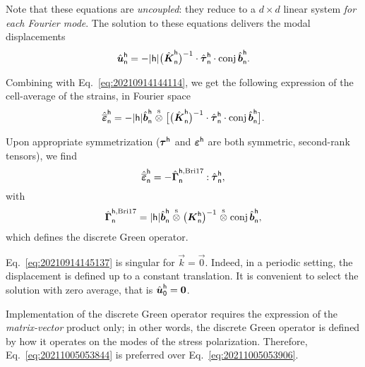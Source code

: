 Note that these equations are \emph{uncoupled}: they reduce to a \(d\times d\)
linear system \emph{for each Fourier mode}. The solution to these equations
delivers the modal displacements
\begin{equation}
  \hat{\boldsymbol u}_\mathsf{n}^\mathsf{h}=-\lvert\mathsf{h}\rvert\bigl(
  \hat{\boldsymbol K}_\mathsf{n}^\mathsf{h}\bigr)^{-1}\cdot
  \hat{\boldsymbol\tau}_\mathsf{n}^\mathsf{h}\cdot\operatorname{conj}\hat{\boldsymbol b}_\mathsf{n}^\mathsf{h}.
\end{equation}

Combining with Eq.~\eqref{eq:20210914144114}, we get the following expression of
the cell-average of the strains, in Fourier space
\begin{equation}
  \label{eq:20211005053844}
  \hat{\overline{\boldsymbol\varepsilon}}_\mathsf{n}^\mathsf{h}=-\lvert\mathsf{h}\rvert
  \hat{\boldsymbol b}_\mathsf{n}^\mathsf{h}\stackrel{\mathrm{s}}{\otimes}\bigl[\bigl(
  \hat{\boldsymbol K}_\mathsf{n}^\mathsf{h}\bigr)^{-1}\cdot
  \hat{\boldsymbol\tau}_\mathsf{n}^\mathsf{h}\cdot\operatorname{conj}\hat{\boldsymbol b}_\mathsf{n}^\mathsf{h}
  \bigr].
\end{equation}

Upon appropriate symmetrization (\(\boldsymbol\tau^\mathsf{h}\) and
\(\boldsymbol\varepsilon^\mathsf{h}\) are both symmetric, second-rank tensors), we find
\begin{equation}
  \hat{\overline{\boldsymbol\varepsilon}}_\mathsf{n}^\mathsf{h}
  =-\hat{\boldsymbol\Gamma}_\mathsf{n}^{\mathsf{h}, \text{Bri17}}\mathbin{\mathord{:}}
  \hat{\boldsymbol\tau}_\mathsf{n}^\mathsf{h},
\end{equation}
with
\begin{equation}
  \label{eq:20211005053906}
  \hat{\boldsymbol\Gamma}_\mathsf{n}^{\mathsf{h}, \text{Bri17}}=\lvert\mathsf{h}\rvert
  \hat{\boldsymbol b}_\mathsf{n}^\mathsf{h}\stackrel{\mathrm{s}}{\otimes}\bigl(\boldsymbol K_\mathsf{n}^\mathsf{h}
  \bigr)^{-1}\stackrel{\mathrm{s}}{\otimes}\operatorname{conj}\hat{\boldsymbol b}_\mathsf{n}^\mathsf{h},
\end{equation}
which defines the discrete Green operator.

\begin{remark}
  Eq.~\eqref{eq:20210914145137} is singular for \(\vec k = \vec 0\). Indeed, in
  a periodic setting, the displacement is defined up to a constant translation.
  It is convenient to select the solution with zero average, that is
  \(\hat{\boldsymbol u}_\mathsf{0}^\mathsf{h}=\boldsymbol 0\).
\end{remark}

\begin{remark}
  Implementation of the discrete Green operator requires the expression of the
  \emph{matrix-vector} product only; in other words, the discrete Green operator
  is defined by how it operates on the modes of the stress
  polarization. Therefore, Eq.~\eqref{eq:20211005053844} is preferred over
  Eq.~\eqref{eq:20211005053906}.
\end{remark}

